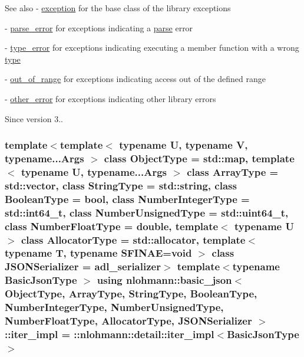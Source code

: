 \begin{DoxySeeAlso}{See also}
-\/ \hyperlink{classnlohmann_1_1basic__json_a9a0aced019cb1d65bb49703406c84970}{exception} for the base class of the library exceptions 

-\/ \hyperlink{classnlohmann_1_1basic__json_af1efc2468e6022be6e35fc2944cabe4d}{parse\+\_\+error} for exceptions indicating a \hyperlink{classnlohmann_1_1basic__json_a265a473e939184aa42655c9ccdf34e58}{parse} error 

-\/ \hyperlink{classnlohmann_1_1basic__json_a4010e8e268fefd86da773c10318f2902}{type\+\_\+error} for exceptions indicating executing a member function with a wrong \hyperlink{classnlohmann_1_1basic__json_a2b2d781d7f2a4ee41bc0016e931cadf7}{type} 

-\/ \hyperlink{classnlohmann_1_1basic__json_a28f7c2f087274a0012eb7a2333ee1580}{out\+\_\+of\+\_\+range} for exceptions indicating access out of the defined range 

-\/ \hyperlink{classnlohmann_1_1basic__json_a3333a5a8714912adda33a35b369f7b3d}{other\+\_\+error} for exceptions indicating other library errors
\end{DoxySeeAlso}
\begin{DoxySince}{Since}
version 3.. 
\end{DoxySince}
\subsubsection[{\texorpdfstring{iter\+\_\+impl}{iter_impl}}]{\setlength{\rightskip}{0pt plus 5cm}template$<$template$<$ typename U, typename V, typename...\+Args $>$ class Object\+Type = std\+::map, template$<$ typename U, typename...\+Args $>$ class Array\+Type = std\+::vector, class String\+Type  = std\+::string, class Boolean\+Type  = bool, class Number\+Integer\+Type  = std\+::int64\+\_\+t, class Number\+Unsigned\+Type  = std\+::uint64\+\_\+t, class Number\+Float\+Type  = double, template$<$ typename U $>$ class Allocator\+Type = std\+::allocator, template$<$ typename T, typename S\+F\+I\+N\+A\+E=void $>$ class J\+S\+O\+N\+Serializer = adl\+\_\+serializer$>$ template$<$typename Basic\+Json\+Type $>$ using {\bf nlohmann\+::basic\+\_\+json}$<$ Object\+Type, Array\+Type, String\+Type, Boolean\+Type, Number\+Integer\+Type, Number\+Unsigned\+Type, Number\+Float\+Type, Allocator\+Type, J\+S\+O\+N\+Serializer $>$\+::{\bf iter\+\_\+impl} =  \+::{\bf nlohmann\+::detail\+::iter\+\_\+impl}$<$Basic\+Json\+Type$>$\hspace{0.3cm}{\ttfamily [private]}}\hypertarget{classnlohmann_1_1basic__json_abfd677a136936c16adf01e335f6a7a72}{}\label{classnlohmann_1_1basic__json_abfd677a136936c16adf01e335f6a7a72}
